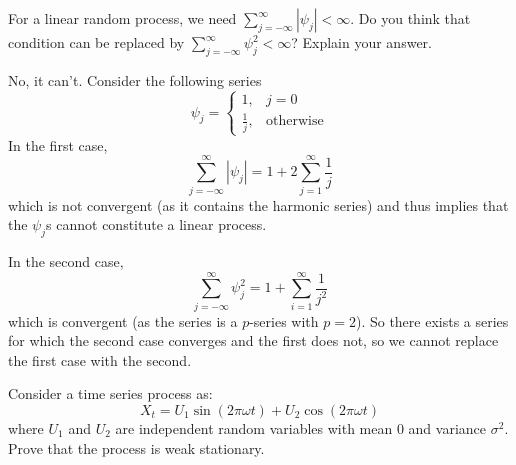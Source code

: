 \documentclass[10pt,a4paper]{exam}
\begin{document}
\begin{questions}
\question For a linear random process, we need $\sum_{j=-\infty}^\infty |\psi_j| < \infty$. Do you think that condition can be replaced by $\sum_{j=-\infty}^\infty \psi_j^2 < \infty$? Explain your answer.

\begin{solution}
No, it can't. Consider the following series
$$\psi_j = \begin{cases}
1, & j = 0\\
\frac{1}{j}, &\text{otherwise}
\end{cases}$$
In the first case,
$$\sum_{j=-\infty}^\infty |\psi_j|= 1 + 2\sum_{j = 1}^\infty \frac{1}{j}$$
which is not convergent (as it contains the harmonic series) and thus implies that the $\psi_j$s cannot constitute a linear process.

In the second case,
$$\sum_{j=-\infty}^\infty \psi_j^2 = 1 + \sum_{i=1}^\infty \frac{1}{j^2}$$
which is convergent (as the series is a $p$-series with $p = 2$). So there exists a series for which the second case converges and the first does not, so we cannot replace the first case with the second.
\end{solution}
\pagebreak
\question Consider a time series process as:
$$X_t = U_1\sin(2\pi\omega t) + U_2 \cos (2\pi \omega t)$$
where $U_1$ and $U_2$ are independent random variables with mean 0 and variance $\sigma^2$. Prove that the process is weak stationary.


\end{questions}
\end{document}
